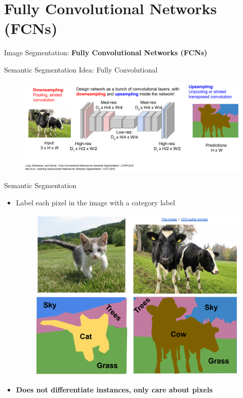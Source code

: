 \section{Fully Convolutional Networks (FCNs)}
\begin{frame}{}
    \LARGE Image Segmentation: \textbf{Fully Convolutional Networks (FCNs)}
\end{frame}

\begin{frame}{Semantic Segmentation Idea: Fully Convolutional}
    \begin{figure}
        \centering
        \includegraphics[width=1.0\textwidth,height=1.0\textheight,keepaspectratio]{images/segmentation/sem_11.png}
    \end{figure}
\end{frame}

\begin{frame}{Semantic Segmentation}
    \begin{itemize}
        \item Label each pixel in the image with a category label
        \begin{figure}
            \centering
            \includegraphics[width=1.0\textwidth,height=0.7\textheight,keepaspectratio]{images/segmentation/sem_12.png}
        \end{figure}
        \pause
        \item \textbf{Does not differentiate instances, only care about pixels}
    \end{itemize}
\end{frame}
